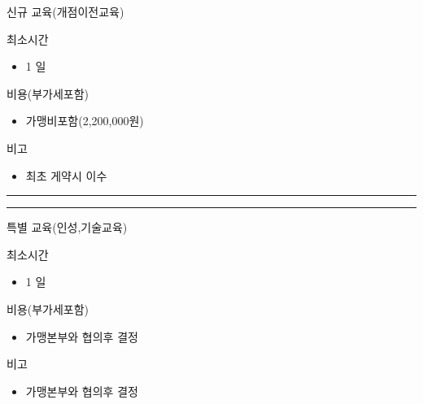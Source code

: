 \documentclass[a5paper,10pt]{oblivoir}
\newcommand\crule[3][black]{\textcolor{#1}{\rule{#2}{#3}}}
\begin{document}
\begin{enumerate}
\begin{tiny}
\begin{Form}
\rule{0cm}{.5cm}

 신규 교육(개점이전교육)

\noindent\dotfill 
 최소시간

\begin{itemize}
\item 1 일
\end{itemize}

\noindent\dotfill 
 비용(부가세포함)

\begin{itemize}
\item 가맹비포함(2,200,000원)
\end{itemize}

\noindent\dotfill 
 비고

\begin{itemize}
\item  최초 게약시 이수
\end{itemize}

\end{Form}
\end{tiny}

\newpage
\begin{center}
\crule[red]{4cm}{0.1cm} \crule[blue]{4cm}{0.1cm}
\end{center}


\begin{tiny}
\begin{Form}
\def\LayoutCheckField#1#2{%
  \parbox[c][5mm]{5mm}{\centering\footnotesize\strut #1\\#2}%
}
\def\LayoutCheckField#1#2{%
  \makebox[0pt][l]{%
    \makebox[5mm][c]{\footnotesize\strut #1}%
  }%
  #2%
}
\def\DefaultHeightofCheckBox{5mm}
\def\DefaultWidthofCheckBox{5mm}

\rule{0cm}{.5cm}

 특별 교육(인성,기술교육)

\noindent\dotfill 
 최소시간

\begin{itemize}
\item 1 일
\end{itemize}

\noindent\dotfill 
 비용(부가세포함)

\begin{itemize}
\item 가맹본부와 협의후 결정
\end{itemize}

\noindent\dotfill 
 비고

\begin{itemize}
\item 가맹본부와 협의후 결정
\end{itemize}


\end{Form}
\end{tiny}
\end{enumerate}
\end{document}
